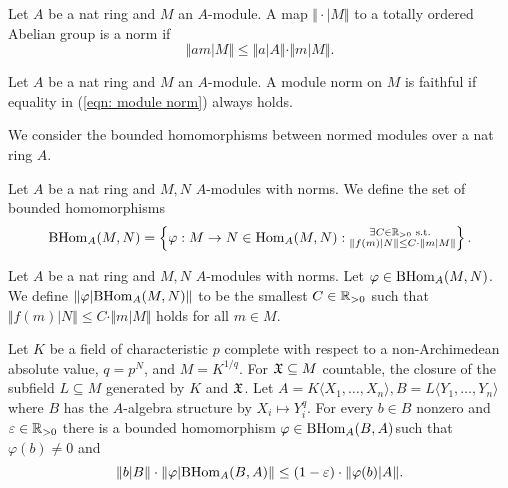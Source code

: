 \begin{definition}\label{def: module norm}
    Let $A$ be a nat ring and $M$ an $A$-module. A map $\Vert\cdot|M\Vert$ to a totally ordered Abelian group is a norm if
    \begin{equation}\label{eqn: module norm}
        \Vert am|M\Vert\leq\Vert a|A\Vert\cdot\Vert m|M\Vert.
    \end{equation}
\end{definition}
\begin{definition}\label{def: faithful module norm}
    Let $A$ be a nat ring and $M$ an $A$-module. A module norm on $M$ is faithful if equality in (\ref{eqn: module norm}) always holds. 
\end{definition}
We consider the bounded homomorphisms between normed modules over a nat ring $A$. 
\begin{definition}\label{def: bounded module homomorphisms}
    Let $A$ be a nat ring and $M,N$ $A$-modules with norms. We define the set of bounded homomorphisms 
    \begin{equation}\label{eqn: def of BHom}
        \mathrm{BHom}_{A}(M,N)=\left\{\varphi:M\to N\in\mathrm{Hom}_{A}(M,N):\substack{\exists C\in\mathbb{R}_{>0}\text{ s.t. }\\ \Vert f(m)|N\Vert\leq C\cdot\Vert m|M\Vert}\right\}.
    \end{equation}
\end{definition}
\begin{definition}\label{def: norm of Homomorphism}
    Let $A$ be a nat ring and $M,N$ $A$-modules with norms. Let $\varphi\in\mathrm{BHom}_{A}(M,N)$. We define $\Vert\varphi|\mathrm{BHom}_{A}(M,N)\Vert$ to be the smallest $C\in\mathbb{R}_{>0}$ such that $\Vert f(m)|N\Vert\leq C\cdot\Vert m|M\Vert$ holds for all $m\in M$. 
\end{definition}
\begin{lemma}\label{lem: p-power roots}
    Let $K$ be a field of characteristic $p$ complete with respect to a non-Archimedean absolute value, $q=p^{N}$, and $M=K^{1/q}$. For $\mathfrak{X}\subseteq M$ countable, the closure of the subfield $L\subseteq M$ generated by $K$ and $\mathfrak{X}$. Let $A=K\langle X_{1},\dots,X_{n}\rangle, B=L\langle Y_{1},\dots,Y_{n}\rangle$ where $B$ has the $A$-algebra structure by $X_{i}\mapsto Y_{i}^{q}$. For every $b\in B$ nonzero and $\varepsilon\in\mathbb{R}_{>0}$ there is a bounded homomorphism $\varphi\in\mathrm{BHom}_{A}(B,A)$such that $\varphi(b)\neq0$ and 
    $$\Vert b|B\Vert\cdot\Vert\varphi|\mathrm{BHom}_{A}(B,A)\Vert\leq(1-\varepsilon)\cdot\Vert\varphi(b)|A\Vert.$$
\end{lemma}
